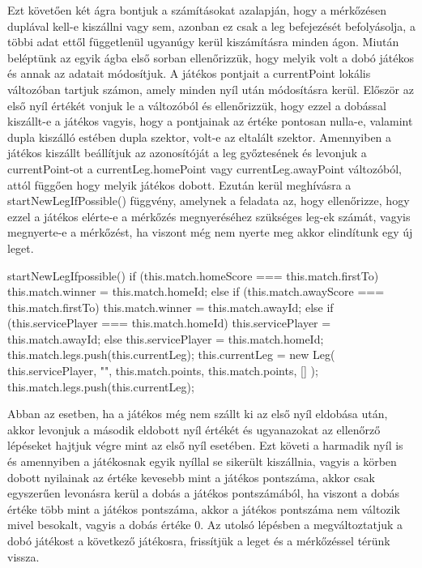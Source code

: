 Ezt követően két ágra bontjuk a számításokat azalapján, hogy a mérkőzésen duplával kell-e kiszállni vagy sem, azonban ez csak a leg befejezését befolyásolja, a többi adat ettől függetlenül ugyanúgy kerül kiszámításra minden ágon. Miután beléptünk az egyik ágba első sorban ellenőrizzük, hogy melyik volt a dobó játékos és annak az adatait módosítjuk. A játékos pontjait a currentPoint lokális változóban tartjuk számon, amely minden nyíl után módosításra kerül. Először az első nyíl értékét vonjuk le a változóból és ellenőrizzük, hogy ezzel a dobással kiszállt-e a játékos vagyis, hogy a pontjainak az értéke pontosan nulla-e, valamint dupla kiszálló estében dupla szektor, volt-e az eltalált szektor. Amennyiben a játékos kiszállt beállítjuk az azonosítóját a leg győztesének és levonjuk a currentPoint-ot a currentLeg.homePoint vagy currentLeg.awayPoint változóból, attól függően hogy melyik játékos dobott. Ezután kerül meghívásra a startNewLegIfPossible() függvény, amelynek a feladata az, hogy ellenőrizze, hogy ezzel a játékos elérte-e a mérkőzés megnyeréséhez szükséges leg-ek számát, vagyis megnyerte-e a mérkőzést, ha viszont még nem nyerte meg akkor elindítunk egy új leget.

\begin{cpp}
  startNewLegIfpossible() {
    if (this.match.homeScore === this.match.firstTo) {
      this.match.winner = this.match.homeId;
    } else if (this.match.awayScore === this.match.firstTo) {
      this.match.winner = this.match.awayId;
    } else {
      if (this.servicePlayer === this.match.homeId) {
        this.servicePlayer = this.match.awayId;
      } else {
        this.servicePlayer = this.match.homeId;
      }
      this.match.legs.push(this.currentLeg);
      this.currentLeg = new Leg(
        this.servicePlayer,
        "",
        this.match.points,
        this.match.points,
        []
      );
      this.match.legs.push(this.currentLeg);
    }
  }
\end{cpp}

Abban az esetben, ha a játékos még nem szállt ki az első nyíl eldobása után, akkor levonjuk a második eldobott nyíl értékét és ugyanazokat az ellenőrző lépéseket hajtjuk végre mint az első nyíl esetében. Ezt követi a harmadik nyíl is és amennyiben a játékosnak egyik nyíllal se sikerült kiszállnia, vagyis a körben dobott nyilainak az értéke kevesebb mint a játékos pontszáma, akkor csak egyszerűen levonásra kerül a dobás a játékos pontszámából, ha viszont a dobás értéke több mint a játékos pontszáma, akkor a játékos pontszáma nem változik mivel besokalt, vagyis a dobás értéke 0. Az utolsó lépésben a megváltoztatjuk a dobó játékost a következő játékosra, frissítjük a leget és a mérkőzéssel térünk vissza.

